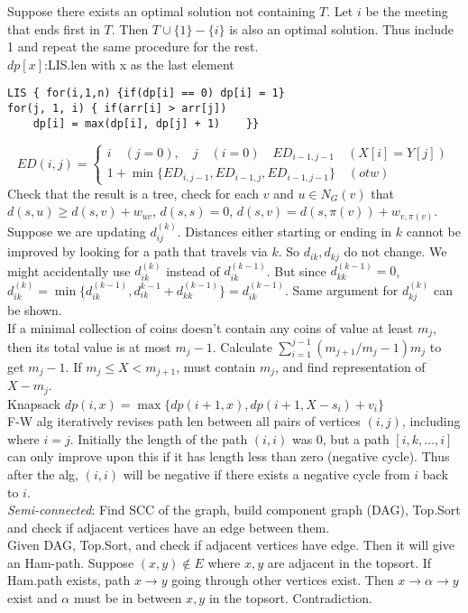 \documentclass[10pt]{report}
\begin{document}
\begin{multicols}{2}
\begin{lstlisting}[style=Cstyle]
\end{lstlisting}
Suppose there exists an optimal solution not containing $T$. Let $i$ be the meeting that ends first in $T$. Then $T\cup\{1\}-\{i\}$ is also an optimal solution. Thus include 1 and repeat the same procedure for the rest.\\
$dp[x]$:LIS.len with x as the last element
\begin{lstlisting}[style=Cstyle]
LIS { for(i,1,n) {if(dp[i] == 0) dp[i] = 1}
for(j, 1, i) { if(arr[i] > arr[j]) 
	dp[i] = max(dp[i], dp[j] + 1)    }}
\end{lstlisting}
$$ED(i, j) = \begin{cases}
	i \quad (j = 0), \quad j \quad (i = 0) \quad ED_{i-1, j-1} \quad (X[i] =Y[j]) \\ 1 + \min\{ED_{i, j-1}, ED_{i-1, j}, ED_{i-1,j-1}\} \quad(otw)
\end{cases}$$
Check that the result is a tree, check for each $v$ and $u\in N_G(v)$ that $d(s, u)\geq d(s, v) +w_{uv}$, $d(s, s) = 0$, $d(s, v) = d(s, \pi(v)) + w_{v, \pi(v)}$.\\
Suppose we are updating $d_{ij}^{(k)}$. Distances either starting or ending in $k$ cannot be improved by looking for a path that travels via $k$. So $d_{ik}, d_{kj}$ do not change. We might accidentally use $d_{ik}^{(k)}$ instead of $d_{ik}^{(k-1)}$. But since $d_{kk}^{(k-1)} = 0$, $d_{ik}^{(k)} = \min\{d_{ik}^{(k-1)}, d_{ik}^{k-1} + d_{kk}^{(k-1)} \} = d_{ik}^{(k-1)}$. Same argument for $d_{kj}^{(k)}$ can be shown.\\
If a minimal collection of coins doesn't contain any coins of value at least $m_j$, then its total value is at most $m_j-1$. Calculate $\sum_{i=1}^{j-1}(m_{j+1}/m_j - 1)m_j$ to get $m_{j}-1$. If $m_{j}\leq X<m_{j+1}$, must contain $m_j$, and find representation of $X-m_j$.\\
Knapsack $dp(i, x) = \max\{dp(i+1, x), dp(i+1, X-s_i) + v_i\}$\\
F-W alg iteratively revises path len between all pairs of vertices $(i, j)$, including where $i=j$. Initially the length of the path $(i, i)$ was 0, but a path $[i, k, \dots, i]$ can only improve upon this if it has length less than zero (negative cycle). Thus after the alg, $(i, i)$ will be negative if there exists a negative cycle from $i$ back to $i$.\\
\textit{Semi-connected}: Find SCC of the graph, build component graph (DAG), Top.Sort and check if adjacent vertices have an edge between them.\\
Given DAG, Top.Sort, and check if adjacent vertices have edge. Then it will give an Ham-path. Suppose $(x, y)\notin E$ where $x, y$ are adjacent in the topsort. If Ham.path exists, path $x\rightarrow y$ going through other vertices exist. Then $x\rightarrow \alpha \rightarrow y$ exist and $\alpha$ must be in between $x, y$ in the topsort. Contradiction.\\

\end{multicols}
\end{document}

